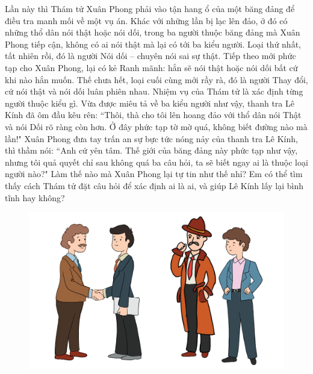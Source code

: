 \begin{multicols}{2}
	Lần này thì Thám tử Xuân Phong phải vào tận hang ổ của một băng đảng để điều tra manh mối về một vụ án. Khác với những lần bị lạc lên đảo, ở đó có những thổ dân nói thật hoặc nói dối, trong ba người thuộc  băng đảng mà Xuân Phong tiếp cận, không có ai nói thật mà lại có tới ba kiểu người. Loại thứ nhất, tất nhiên rồi, đó là người Nói dối -- chuyên nói sai sự thật. Tiếp theo mới phức tạp cho Xuân Phong, lại có kẻ Ranh mãnh: hắn sẽ nói thật hoặc nói dối bất cứ khi nào hắn muốn. Thế chưa hết, loại cuối cùng mới rầy rà, đó là người Thay đổi, cứ nói thật và nói dối luân phiên nhau. Nhiệm vụ của Thám tử là xác định  từng người thuộc kiểu gì. Vừa được miêu tả về ba kiểu người như vậy, thanh tra Lê Kính đã ôm đầu kêu rên: ``Thôi, thà cho tôi lên hoang đảo với thổ dân nói Thật và nói Dối rõ ràng còn hơn. Ở đây phức tạp tờ mờ quá, không biết đường nào mà lần!"
	\vskip 0.1cm
	Xuân Phong đưa tay trấn an sự bực tức nóng nảy của thanh tra Lê Kính, thì thầm nói: ``Anh cứ yên tâm. Thế giới của băng đảng này phức tạp như vậy, nhưng tôi quả quyết chỉ sau không quá ba câu hỏi, ta sẽ biết ngay ai là thuộc loại người nào?"
	\vskip 0.1cm
	Làm thế nào mà Xuân Phong lại tự tin như thế nhỉ? Em có thể tìm thấy cách Thám tử đặt câu hỏi để xác định ai là ai, và giúp Lê Kính lấy lại bình tĩnh hay không?
\end{multicols}
\begin{figure}[H]
	\centering
	\vspace*{-5pt}
	\captionsetup{labelformat= empty, justification=centering}
	\includegraphics[width=0.98\linewidth]{xuanphong}
	\vspace*{-10pt}
\end{figure}
\newpage
\begingroup
